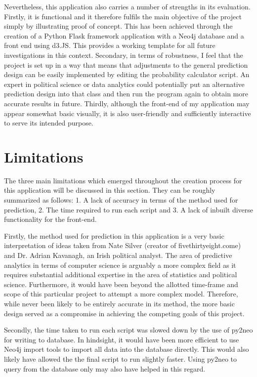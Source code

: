 Nevertheless, this application also carries a number of strengths in its evaluation. Firstly, it is functional and it therefore fulfils the main objective of the project simply by illustrating proof of concept. This has been achieved through the creation of a Python Flask framework application with a Neo4j database and a front end using d3.JS. This provides a working template for all future investigations in this context.  Secondary, in terms of robustness, I feel that the project is set up in a way that means that adjustments to the general prediction design can be easily implemented by editing the probability calculator script. An expert in political science or data analytics could potentially put an alternative prediction design into that class and then run the program again to obtain more accurate results in future.  Thirdly, although the front-end of my application may appear somewhat basic visually, it is also user-friendly and sufficiently interactive to serve its intended purpose. 
\section{Limitations}
The three main limitations which emerged throughout the creation process for this application will be discussed in this section. They can be roughly summarized as follows: 1. A lack of accuracy in terms of the method used for prediction, 2. The time required to run each script and 3. A lack of inbuilt diverse functionality for the front-end.
   
Firstly, the method used for prediction in this application is a very basic interpretation of  ideas taken from Nate Silver (creator of fivethirtyeight.come) and Dr. Adrian Kavanagh, an Irish political analyst. 
The area of predictive analytics in terms of computer science is arguably a more complex field as it requires substantial additional expertise in the area of statistics and political science. Furthermore, it would have been beyond the allotted time-frame and scope of this particular project to attempt a more complex model. Therefore, while never been likely to be entirely accurate in its method, the more basic design served as a compromise in achieving the competing goals of this project. 

Secondly, the time taken to run each script was slowed down by the use of py2neo for writing to database. In hindsight, it would have been more efficient to use Neo4j import tools to import all data into the database directly. This would also likely have allowed the the final script to run slightly faster. Using py2neo to query from the database only may also have helped in this regard.

